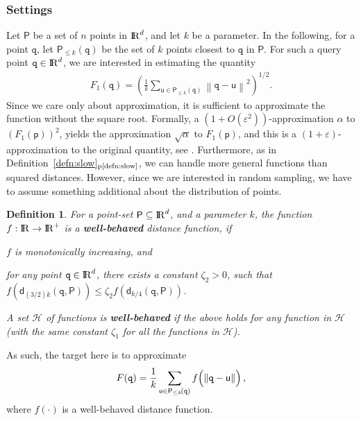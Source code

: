 \documentclass[12pt]{article}
\newcommand{\emphic}[2]{\textcolor{blue25}{\textbf{\emph{#1}}}\index{#2}}
\newcommand{\emphi}[1]{\emphic{#1}{#1}}
\newtheorem{defn}[theorem]{Definition}
\theoremstyle{remark}{\theorembodyfont{\rm} \newtheorem{remark}[theorem]{Remark}}
\newcommand{\eqlab}[1]{\label{equation:#1}}
\newcommand{\seclab}[1]{{\label{section:#1}}}
\newcommand{\deflab}[1]{\label{defn:#1}}
\newcommand{\defrefpage}[1]{Definition~\ref{defn:#1}$_\text{p\pageref{defn:#1}}$}
\newcommand{\MakeBig}{\rule[-.2cm]{0cm}{0.4cm}}
\newcommand{\pth}[2][\!]{#1\left({#2}\right)}
\newcommand{\normY}[2]{\left\lVert {#1} - {#2} \right \rVert}
\newcommand{\distPk}[3]{\mathsf{d}_{#3}\pth{#2,#1}}
\newcommand{\eps}{{\varepsilon}}\newcommand{\divides}{|}
\renewcommand{\Re}{{\rm I\!\hspace{-0.025em} R}}
\newcommand{\PntSet}{\mathsf{P}}
\newcommand{\query}{\mathtt{q}}
\newcommand{\pnt} {\mathsf{p}}
\newcommand{\pntA}{\mathsf{u}}
\newcommand{\distY}[2]{\normY{#1}{#2}}
\newcommand{\constA}{\zeta_1}
\newcommand{\constC}{\zeta_2}
\newcommand{\hdim}{d}
\newcommand{\Pk}[2][\!]{\PntSet_{\leq k}\pth[#1]{#2}}
\newcommand{\Family}{\mathcal{H}}\newcommand{\dhalf}[2][\!]{\mathsf{d}_{n/2}\pth[#1]{#2}}
\begin{document}
\subsubsection{Settings}
\seclab{settings:density}

Let $\PntSet$ be a set of $n$ points in $\Re^\hdim$, and let $k$ be a
parameter.  In the following, for a point $\query$, let $\Pk{\query}$
be the set of $k$ points closest to $\query$ in $\PntSet$.  For such a
query point $\query \in \Re^d$, we are interested in estimating the
quantity
\begin{align}\eqlab{estimate:sq}{F}_1(\query) = \pth[]{\frac{1}{k}\sum_{\pntA \in \Pk{\query}}
       {\distY{\query}{\pntA}}^2 }^{1/2}.
\end{align}
Since we care only about approximation, it is sufficient to
approximate the function without the square root. Formally, a
$\pth[]{1+O(\eps^2)}$-approximation $\alpha$ to
$\pth[]{{F}_1(\pnt)}^2$, yields the approximation $\sqrt{\alpha}$ to
${{F}_1(\pnt)}$, and this is a $(1+\eps)$-approximation to the
original quantity, see \cite[Lemma 4.6]{ahv-aemp-04}. Furthermore, as
in \defrefpage{slow}, we can handle more general functions than
squared distances. However, since we are interested in random
sampling, we have to assume something additional about the
distribution of points.

\begin{defn}\deflab{well:behaved}For a point-set $\PntSet \subseteq \Re^d$, and a parameter $k$,
    the function $f:\Re \rightarrow \Re^+$ is a \emphi{well-behaved}
    distance function, if \smallskip \begin{compactenum}[\quad(i)]
        \item $f$ is monotonically increasing, and
        \item for any point $\query \in \Re^d$, there exists a
        constant $\constC > 0$, such that $f\pth{
           \distPk{\PntSet}{\query}{(3/2)k}} \leq \constC f
        \pth{\distPk{\PntSet}{\query}{k/4}}$.
    \end{compactenum}
    \smallskip A set $\Family$ of functions is \emphi{well-behaved} if the above
    holds for any function in $\Family$ (with the same constant
    $\constA$ for all the functions in $\Family$).
\end{defn}

As such, the target here is to approximate
\begin{align}
    F(\query)=\frac{1}{k}\sum_{\pntA \in \Pk{\query}}
    f\pth{\distY{\query}{\pntA} \MakeBig\! } ,\eqlab{halving}\end{align}
where $f(\cdot)$ is a well-behaved distance function. 
\end{document}
